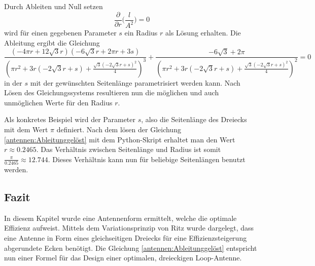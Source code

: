 Durch Ableiten und Null setzen
\begin{equation}
	\frac{\partial}{\partial{r}} \bigg(\frac{l}{A^2}\bigg)=0
	\label{antennen:Ableitung}
\end{equation}
wird für einen gegebenen Parameter $s$ ein Radius $r$ als Lösung erhalten. 
Die Ableitung ergibt die Gleichung 
\begin{equation}
	\frac{\left(- 4 \pi r + 12 \sqrt{3} r\right) \left(- 6 \sqrt{3} r + 2 \pi r + 3 s\right)}{\left(\pi r^{2} + 3 r \left(- 2 \sqrt{3} r + s\right) + \frac{\sqrt{3} \left(- 2 \sqrt{3} r + s\right)^{2}}{4}\right)^{3}} + \frac{- 6 \sqrt{3} + 2 \pi}{\left(\pi r^{2} + 3 r \left(- 2 \sqrt{3} r + s\right) + \frac{\sqrt{3} \left(- 2 \sqrt{3} r + s\right)^{2}}{4}\right)^{2}}=0
	\label{antennen:Ableitunggelöst}
\end{equation}
in der $s$ mit der gewünschten Seitenlänge parametrisiert werden kann. Nach Lösen des Gleichungssystems resultieren nun die möglichen und auch unmöglichen Werte für den Radius $r$. 

Als konkretes Beispiel wird der Parameter $s$, also die Seitenlänge des Dreiecks mit dem Wert $\pi$ definiert. 
Nach dem lösen der Gleichung \eqref{antennen:Ableitunggelöst} mit dem Python-Skript \cite{antennen:codeAbleitung} erhaltet
man den Wert $r\approx0.2465$. Das Verhältnis zwischen Seitenlänge und Radius ist somit $\frac{\pi}{0.2465} \approx 12.744$.
Dieses Verhältnis kann nun für beliebige Seitenlängen benutzt werden.

\subsection{Fazit\label{antennen:fazit}}
In diesem Kapitel wurde eine Antennenform ermittelt, welche die optimale Effizienz aufweist. Mittels dem Variationsprinzip von Ritz wurde dargelegt, dass eine Antenne in Form eines gleichseitigen Dreiecks für eine Effizienzsteigerung abgerundete Ecken benötigt. Die Gleichung \eqref{antennen:Ableitunggelöst} entspricht nun einer Formel für das Design einer optimalen, dreieckigen Loop-Antenne. 
